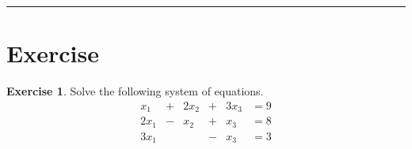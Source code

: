 \documentclass[
]{book}
\theoremstyle{definition}
\theoremstyle{definition}
\theoremstyle{definition}
\newtheorem{exercise}{Exercise}[chapter]
\theoremstyle{definition}
\theoremstyle{remark}
\begin{document}
\begin{center}\rule{0.5\linewidth}{0.5pt}\end{center}

\section{Exercise}\label{exercise-5}

\begin{exercise}
\protect\hypertarget{exr:unnamed-chunk-3}{}\label{exr:unnamed-chunk-3}Solve the following system of equations.
\[
\begin{array}{ccccccc}
x_1  &+& 2x_2 &+& 3x_3 &= 9 \\
2x_1 &-& x_2  &+& x_3  &= 8 \\
3x_1 & &      &-& x_3&= 3
\end{array}
\]
\end{exercise}
\end{document}
